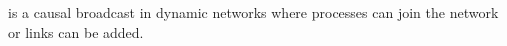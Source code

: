 

\begin{lemma}
  \CBROADCAST is a causal broadcast in dynamic networks where processes can join
  the network or links can be added.
\end{lemma}

